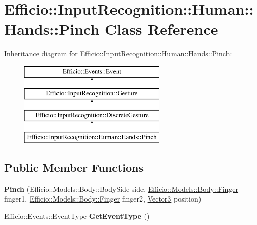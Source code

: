\hypertarget{class_efficio_1_1_input_recognition_1_1_human_1_1_hands_1_1_pinch}{}\section{Efficio\+:\+:Input\+Recognition\+:\+:Human\+:\+:Hands\+:\+:Pinch Class Reference}
\label{class_efficio_1_1_input_recognition_1_1_human_1_1_hands_1_1_pinch}
Inheritance diagram for Efficio\+:\+:Input\+Recognition\+:\+:Human\+:\+:Hands\+:\+:Pinch\+:\begin{figure}[H]
\begin{center}
\leavevmode
\includegraphics[height=4.000000cm]{class_efficio_1_1_input_recognition_1_1_human_1_1_hands_1_1_pinch}
\end{center}
\end{figure}
\subsection*{Public Member Functions}
\begin{DoxyCompactItemize}
\item 
{\bfseries Pinch} (Efficio\+::\+Models\+::\+Body\+::\+Body\+Side side, \hyperlink{class_efficio_1_1_models_1_1_body_1_1_finger}{Efficio\+::\+Models\+::\+Body\+::\+Finger} finger1, \hyperlink{class_efficio_1_1_models_1_1_body_1_1_finger}{Efficio\+::\+Models\+::\+Body\+::\+Finger} finger2, \hyperlink{class_efficio_1_1_vector3}{Vector3} position)\hypertarget{class_efficio_1_1_input_recognition_1_1_human_1_1_hands_1_1_pinch_a9c408220b117ffb674a5e41b58c60985}{}\label{class_efficio_1_1_input_recognition_1_1_human_1_1_hands_1_1_pinch_a9c408220b117ffb674a5e41b58c60985}

\item 
Efficio\+::\+Events\+::\+Event\+Type {\bfseries Get\+Event\+Type} ()\hypertarget{class_efficio_1_1_input_recognition_1_1_human_1_1_hands_1_1_pinch_a579897e092310066f9dab8df222fc863}{}\label{class_efficio_1_1_input_recognition_1_1_human_1_1_hands_1_1_pinch_a579897e092310066f9dab8df222fc863}

\end{DoxyCompactItemize}

